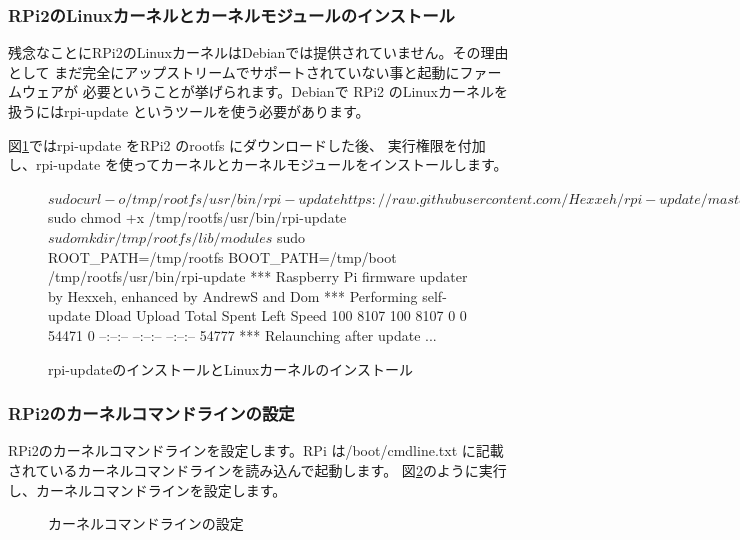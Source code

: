 \documentclass[mingoth,a4paper]{jsarticle}
\begin{document}
\subsubsection{RPi2のLinuxカーネルとカーネルモジュールのインストール}

残念なことにRPi2のLinuxカーネルはDebianでは提供されていません。その理由として
まだ完全にアップストリームでサポートされていない事と起動にファームウェアが
必要ということが挙げられます。Debianで RPi2 のLinuxカーネルを扱うにはrpi-update
というツールを使う必要があります。

図\ref{fig:kernelinstall}ではrpi-update をRPi2 のrootfs にダウンロードした後、
実行権限を付加し、rpi-update を使ってカーネルとカーネルモジュールをインストールします。

\begin{figure}[htbp]
\begin{commandline}
$ sudo curl -o /tmp/rootfs/usr/bin/rpi-update https://raw.githubusercontent.com/Hexxeh/rpi-update/master/rpi-update
$ sudo chmod +x /tmp/rootfs/usr/bin/rpi-update
$ sudo mkdir /tmp/rootfs/lib/modules
$ sudo ROOT_PATH=/tmp/rootfs BOOT_PATH=/tmp/boot /tmp/rootfs/usr/bin/rpi-update
*** Raspberry Pi firmware updater by Hexxeh, enhanced by AndrewS and Dom 
 *** Performing self-update
                                 Dload  Upload   Total   Spent    Left  Speed
100  8107  100  8107    0     0  54471      0 --:--:-- --:--:-- --:--:-- 54777
 *** Relaunching after update
...
\end{commandline}
\label{fig:kernelinstall}
\caption{rpi-updateのインストールとLinuxカーネルのインストール}
\end{figure}

\subsubsection{RPi2のカーネルコマンドラインの設定}

RPi2のカーネルコマンドラインを設定します。RPi は/boot/cmdline.txt
に記載されているカーネルコマンドラインを読み込んで起動します。
図\ref{fig:commandlineset}のように実行し、カーネルコマンドラインを設定します。

\begin{figure}[htbp]
\label{fig:commandlineset}
\caption{カーネルコマンドラインの設定}
\end{figure}
\end{document}
